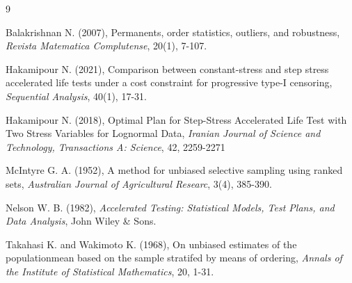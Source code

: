 \documentclass[twoside]{article}
\begin{document}
\begin{thebibliography}{9}

Balakrishnan N. (2007), Permanents, order statistics, outliers, and robustness, {\it Revista Matematica Complutense}, 20(1), 7-107.

Hakamipour N. (2021), Comparison between constant-stress and step stress accelerated life tests under a cost constraint for progressive type-I censoring, {\it Sequential
Analysis}, 40(1), 17-31.

Hakamipour N. (2018), Optimal Plan for Step-Stress Accelerated Life Test with Two Stress Variables for Lognormal Data, {\it Iranian Journal of Science and
Technology, Transactions A: Science}, 42, 2259-2271

McIntyre G. A. (1952), A method for unbiased selective sampling using ranked sets, {\it Australian Journal of Agricultural Researc}, 3(4), 385-390.

Nelson W. B. (1982), {\it Accelerated Testing: Statistical Models, Test Plans, and Data Analysis},  John Wiley \& Sons.

Takahasi K. and Wakimoto K. (1968), On unbiased estimates of the populationmean based on the sample stratifed by means of ordering, {\it Annals of the Institute of Statistical Mathematics}, 20, 1-31.

\end{thebibliography}
 
\end{document}
